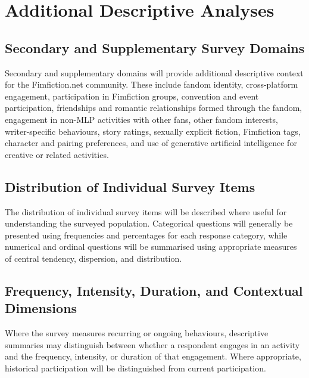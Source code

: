 \section{Additional Descriptive Analyses}

\subsection{Secondary and Supplementary Survey Domains}

Secondary and supplementary domains will provide additional descriptive context for the Fimfiction.net community. These include fandom identity, cross-platform engagement, participation in Fimfiction groups, convention and event participation, friendships and romantic relationships formed through the fandom, engagement in non-MLP activities with other fans, other fandom interests, writer-specific behaviours, story ratings, sexually explicit fiction, Fimfiction tags, character and pairing preferences, and use of generative artificial intelligence for creative or related activities.


\subsection{Distribution of Individual Survey Items}

The distribution of individual survey items will be described where useful for understanding the surveyed population. Categorical questions will generally be presented using frequencies and percentages for each response category, while numerical and ordinal questions will be summarised using appropriate measures of central tendency, dispersion, and distribution.


\subsection{Frequency, Intensity, Duration, and Contextual Dimensions}

Where the survey measures recurring or ongoing behaviours, descriptive summaries may distinguish between whether a respondent engages in an activity and the frequency, intensity, or duration of that engagement. Where appropriate, historical participation will be distinguished from current participation.

